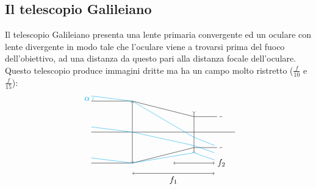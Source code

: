 \documentclass[a4paper, oneside]{book}
\begin{document}
\subsection{Il telescopio Galileiano}
Il telescopio Galileiano presenta una lente primaria convergente ed un oculare con lente
divergente in modo tale che l'oculare viene a trovarsi prima del fuoco dell'obiettivo,
ad una distanza da questo pari alla distanza focale dell'oculare. Questo telescopio produce immagini dritte 
ma ha un campo molto ristretto ($\frac{f}{10}$ e $\frac{f}{15}$):
\begin{gather*}
    \begin{tikzpicture}[scale=0.85]
        \draw(0, 0) -- (7, 0);
        \draw[<->](2, -1.5) -- (2, 1.5);
        \draw[>-<](5, -1) -- (5, 1);
        \draw[cyan](0.1, 1.7) arc (160:180:0.5) node[midway, left] {$\alpha$};
        \draw(0, 1.5) -- (2, 1.5) -- (5, 0.75) -- (6, 0.75);
        \draw[dashed](6, 0.75) -- (6.5, 0.75);
        \draw(0, -1.5) -- (2, -1.5) -- (5, -0.75) -- (6, -0.75);
        \draw[dashed](6, -0.75) -- (6.5, -0.75);
        \draw[cyan](0, 1.75) -- (2, 1.5) -- (5, -0.25) -- (6, -0.65);
        \draw[cyan](0, 0.25) -- (2, 0) -- (5, -0.65) -- (6, -1);
        \draw[cyan](0, -1.25) -- (2, -1.5) -- (5, -1) -- (6, -1.35);
        \draw[<->](2, -2) -- (6, -2) node[midway, below] {$f_1$};
        \draw[<->](4, -1.5) -- (6, -1.5) node[at end, right] {$f_2$};
    \end{tikzpicture}
\end{gather*}
\end{document}
